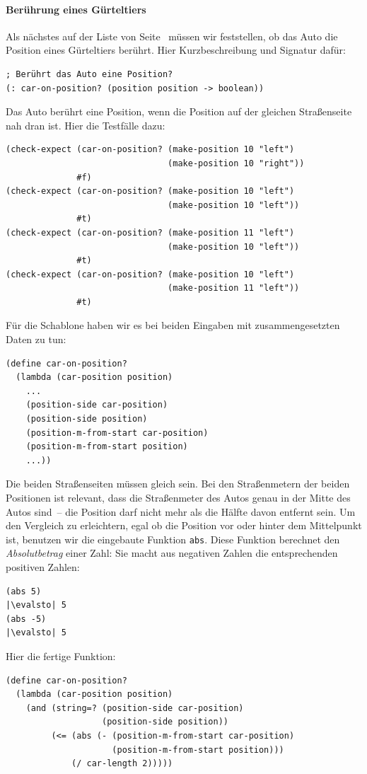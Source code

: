 \paragraph{Berührung eines Gürteltiers} Als nächstes auf der Liste von
Seite~\pageref{page:dillo-world-todos} müssen wir feststellen, ob das
Auto die Position eines Gürteltiers berührt.
Hier Kurzbeschreibung und Signatur dafür:
%
\begin{lstlisting}
; Berührt das Auto eine Position?
(: car-on-position? (position position -> boolean))
\end{lstlisting}
%
Das Auto berührt eine Position, wenn die Position auf der gleichen
Straßenseite nah dran ist.  Hier die Testfälle dazu:
%
\begin{lstlisting}
(check-expect (car-on-position? (make-position 10 "left")
                                (make-position 10 "right"))
              #f)
(check-expect (car-on-position? (make-position 10 "left")
                                (make-position 10 "left"))
              #t)
(check-expect (car-on-position? (make-position 11 "left")
                                (make-position 10 "left"))
              #t)
(check-expect (car-on-position? (make-position 10 "left")
                                (make-position 11 "left"))
              #t)
\end{lstlisting}
%
Für die Schablone haben wir es bei beiden Eingaben mit
zusammengesetzten Daten zu tun:
%
\begin{lstlisting}
(define car-on-position?
  (lambda (car-position position)
    ...
    (position-side car-position) 
    (position-side position)
    (position-m-from-start car-position)
    (position-m-from-start position)
    ...))
\end{lstlisting}
%
Die beiden Straßenseiten müssen gleich sein.  Bei den Straßenmetern
der beiden Positionen ist relevant, dass die Straßenmeter des Autos
genau in der Mitte des Autos sind~-- die Position darf nicht mehr als
die Hälfte davon entfernt sein.  Um den Vergleich zu erleichtern, egal
ob die Position vor oder hinter dem Mittelpunkt ist, benutzen wir die
eingebaute Funktion \lstinline{abs}.\label{func:abs}  Diese
Funktion berechnet den \textit{Absolutbetrag}
einer Zahl: Sie macht aus negativen Zahlen die entsprechenden
positiven Zahlen:
%
\begin{lstlisting}
(abs 5)
|\evalsto| 5
(abs -5)
|\evalsto| 5
\end{lstlisting}
%
Hier die fertige Funktion:
%
\begin{lstlisting}
(define car-on-position?
  (lambda (car-position position)
    (and (string=? (position-side car-position) 
                   (position-side position))
         (<= (abs (- (position-m-from-start car-position)
                     (position-m-from-start position)))
             (/ car-length 2)))))
\end{lstlisting}

